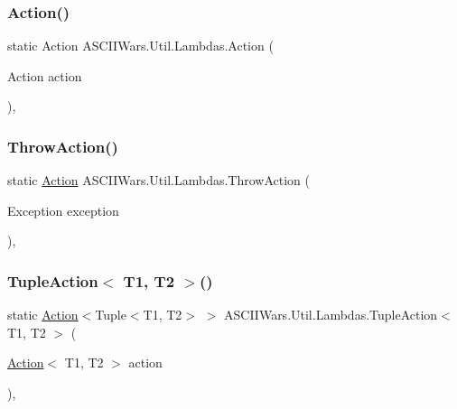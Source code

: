 \subsubsection{\texorpdfstring{Action()}{Action()}}
{\footnotesize\ttfamily static Action A\+S\+C\+I\+I\+Wars.\+Util.\+Lambdas.\+Action (\begin{DoxyParamCaption}\item[{Action}]{action }\end{DoxyParamCaption})\hspace{0.3cm}{\ttfamily [inline]}, {\ttfamily [static]}}

\hypertarget{class_a_s_c_i_i_wars_1_1_util_1_1_lambdas_afaafdd8601527db1adaf5877569bbf27}{}\label{class_a_s_c_i_i_wars_1_1_util_1_1_lambdas_afaafdd8601527db1adaf5877569bbf27} 
\subsubsection{\texorpdfstring{Throw\+Action()}{ThrowAction()}}
{\footnotesize\ttfamily static \hyperlink{class_a_s_c_i_i_wars_1_1_util_1_1_lambdas_a4bc80215a9cdc6519f88d7d73ef0a2d9}{Action} A\+S\+C\+I\+I\+Wars.\+Util.\+Lambdas.\+Throw\+Action (\begin{DoxyParamCaption}\item[{Exception}]{exception }\end{DoxyParamCaption})\hspace{0.3cm}{\ttfamily [inline]}, {\ttfamily [static]}}

\hypertarget{class_a_s_c_i_i_wars_1_1_util_1_1_lambdas_adbf41b3baf907a23c8676e72bbb53a63}{}\label{class_a_s_c_i_i_wars_1_1_util_1_1_lambdas_adbf41b3baf907a23c8676e72bbb53a63} 
\subsubsection{\texorpdfstring{Tuple\+Action$<$ T1, T2 $>$()}{TupleAction< T1, T2 >()}}
{\footnotesize\ttfamily static \hyperlink{class_a_s_c_i_i_wars_1_1_util_1_1_lambdas_a4bc80215a9cdc6519f88d7d73ef0a2d9}{Action}$<$Tuple$<$T1, T2$>$ $>$ A\+S\+C\+I\+I\+Wars.\+Util.\+Lambdas.\+Tuple\+Action$<$ T1, T2 $>$ (\begin{DoxyParamCaption}\item[{\hyperlink{class_a_s_c_i_i_wars_1_1_util_1_1_lambdas_a4bc80215a9cdc6519f88d7d73ef0a2d9}{Action}$<$ T1, T2 $>$}]{action }\end{DoxyParamCaption})\hspace{0.3cm}{\ttfamily [inline]}, {\ttfamily [static]}}


